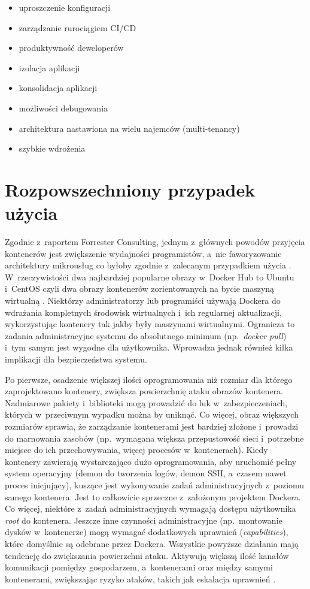 \begin{itemize}
    \item uproszczenie konfiguracji
    \item zarządzanie rurociągiem CI/CD
    \item produktywność deweloperów
    \item izolacja aplikacji
    \item konsolidacja aplikacji
    \item możliwości debugowania
    \item architektura nastawiona na wielu najemców (multi-tenancy)
    \item szybkie wdrożenia
\end{itemize}

\section{Rozpowszechniony przypadek użycia}

Zgodnie z~raportem Forrester Consulting, jednym z~głównych powodów przyjęcia kontenerów jest zwiększenie wydajności programistów, a~nie faworyzowanie architektury mikrousług co byłoby zgodnie z~zalecanym przypadkiem użycia \cite{ForresterContainersRealAdoptionAndUseCases}. W~rzeczywistości dwa najbardziej popularne obrazy w~Docker Hub to Ubuntu i~CentOS czyli dwa obrazy kontenerów zorientowanych na bycie maszyną wirtualną \cite{DockerHubImages}. Niektórzy administratorzy lub programiści używają Dockera do wdrażania kompletnych środowisk wirtualnych i~ich regularnej aktualizacji, wykorzystując kontenery tak jakby były maszynami wirtualnymi. Ogranicza to zadania administracyjne systemu do absolutnego minimum (np.~\textit{docker pull}) i~tym samym jest wygodne dla użytkownika. Wprowadza jednak również kilka implikacji dla bezpieczeństwa systemu. 

Po pierwsze, osadzenie większej ilości oprogramowania niż rozmiar dla którego zaprojektowano kontenery, zwiększa powierzchnię ataku obrazów kontenera. Nadmiarowe pakiety i~biblioteki mogą prowadzić do luk w~zabezpieczeniach, których w~przeciwnym wypadku można by uniknąć. Co więcej, obraz większych rozmiarów sprawia, że zarządzanie kontenerami jest bardziej złożone i~prowadzi do marnowania zasobów (np.~wymagana większa przepustowość sieci i~potrzebne miejsce do ich przechowywania, więcej procesów w~kontenerach). Kiedy kontenery zawierają wystarczająco dużo oprogramowania, aby uruchomić pełny system operacyjny (demon do tworzenia logów, demon SSH, a~czasem nawet proces inicjujący), kuszące jest wykonywanie zadań administracyjnych z~poziomu samego kontenera. Jest to całkowicie sprzeczne z~założonym projektem Dockera. Co więcej, niektóre z~zadań administracyjnych wymagają dostępu użytkownika \textit{root} do kontenera. Jeszcze inne czynności administracyjne (np.~montowanie dysków w~kontenerze) mogą wymagać dodatkowych uprawnień (\textit{capabilities}), które domyślnie są odebrane przez Dockera. Wszystkie powyższe działania mają tendencję do zwiększania powierzchni ataku. Aktywują większą ilość kanałów komunikacji pomiędzy gospodarzem, a~kontenerami oraz między samymi kontenerami, zwiększając ryzyko ataków, takich jak eskalacja uprawnień \cite{ColemanContainerAreNotVMs}.

